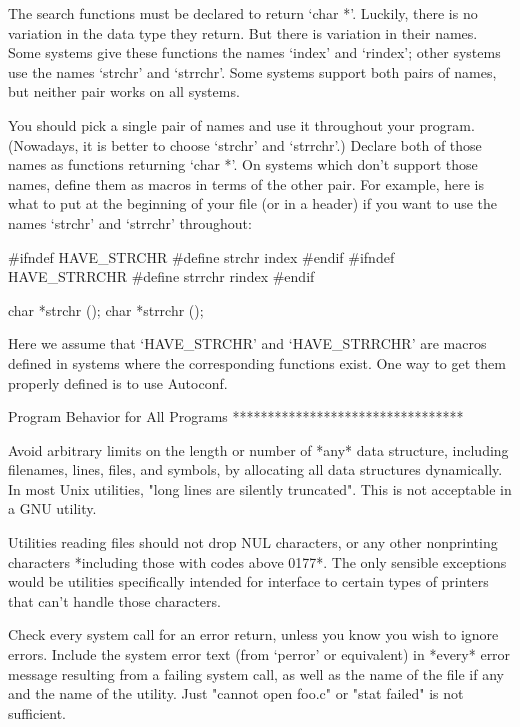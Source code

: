      The search functions must be declared to return `char *'.  Luckily,
     there is no variation in the data type they return.  But there is
     variation in their names.  Some systems give these functions the
     names `index' and `rindex'; other systems use the names `strchr'
     and `strrchr'.  Some systems support both pairs of names, but
     neither pair works on all systems.

     You should pick a single pair of names and use it throughout your
     program.  (Nowadays, it is better to choose `strchr' and
     `strrchr'.)  Declare both of those names as functions returning
     `char *'.  On systems which don't support those names, define them
     as macros in terms of the other pair.  For example, here is what
     to put at the beginning of your file (or in a header) if you want
     to use the names `strchr' and `strrchr' throughout:

          #ifndef HAVE_STRCHR
          #define strchr index
          #endif
          #ifndef HAVE_STRRCHR
          #define strrchr rindex
          #endif
          
          char *strchr ();
          char *strrchr ();

   Here we assume that `HAVE_STRCHR' and `HAVE_STRRCHR' are macros
defined in systems where the corresponding functions exist.  One way to
get them properly defined is to use Autoconf.

Program Behavior for All Programs
*********************************

   Avoid arbitrary limits on the length or number of *any* data
structure, including filenames, lines, files, and symbols, by allocating
all data structures dynamically.  In most Unix utilities, "long lines
are silently truncated".  This is not acceptable in a GNU utility.

   Utilities reading files should not drop NUL characters, or any other
nonprinting characters *including those with codes above 0177*.  The
only sensible exceptions would be utilities specifically intended for
interface to certain types of printers that can't handle those
characters.

   Check every system call for an error return, unless you know you
wish to ignore errors.  Include the system error text (from `perror' or
equivalent) in *every* error message resulting from a failing system
call, as well as the name of the file if any and the name of the
utility.  Just "cannot open foo.c" or "stat failed" is not sufficient.

